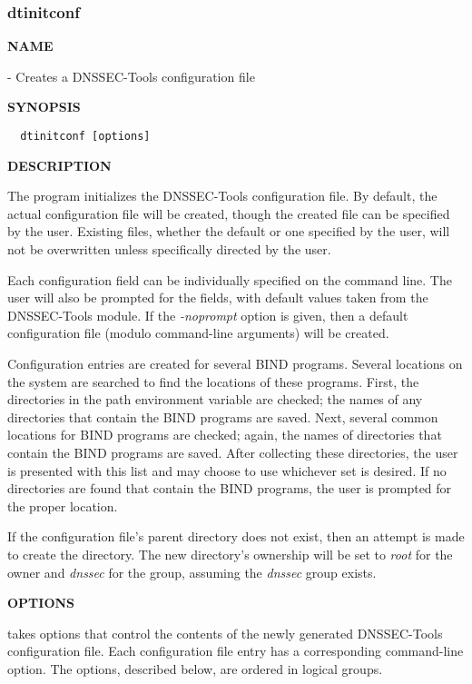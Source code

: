 \clearpage

\subsubsection{dtinitconf}

{\bf NAME}

 - Creates a DNSSEC-Tools configuration file

{\bf SYNOPSIS}

\begin{verbatim}
  dtinitconf [options]
\end{verbatim}

{\bf DESCRIPTION}

The  program initializes the DNSSEC-Tools configuration file.
By default, the actual configuration file will be created, though the created
file can be specified by the user.  Existing files, whether the default or one
specified by the user, will not be overwritten unless specifically directed
by the user.

Each configuration field can be individually specified on the command line.
The user will also be prompted for the fields, with default values taken from
the DNSSEC-Tools  module.  If the {\it -noprompt} option
is given, then a default configuration file (modulo command-line arguments)
will be created.

Configuration entries are created for several BIND programs.  Several
locations on the system are searched to find the locations of these programs. 
First, the directories in the path environment variable are checked; the
names of any directories that contain the BIND programs are saved.  Next,
several common locations for BIND programs are checked; again, the names of
directories that contain the BIND programs are saved.  After collecting these
directories, the user is presented with this list and may choose to use
whichever set is desired.  If no directories are found that contain the BIND
programs, the user is prompted for the proper location.

If the configuration file's parent directory does not exist, then an attempt
is made to create the directory.  The new directory's ownership will be set
to {\it root} for the owner and {\it dnssec} for the group, assuming the
{\it dnssec} group exists.

{\bf OPTIONS}

 takes options that control the contents of the newly generated
DNSSEC-Tools configuration file.  Each configuration file entry has a
corresponding command-line option.  The options, described below, are ordered
in logical groups.

